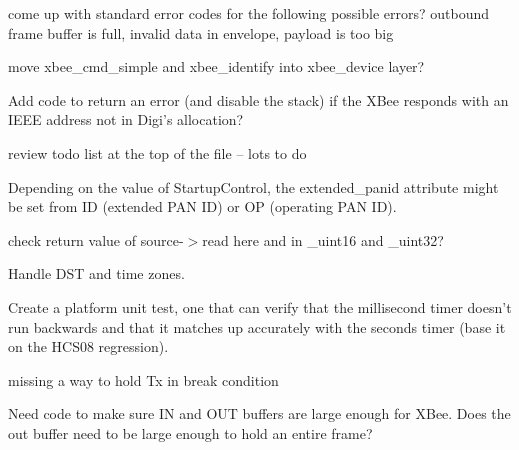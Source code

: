 \begin{DoxyRefList}
come up with standard error codes for the following possible errors? outbound frame buffer is full, invalid data in envelope, payload is too big  
\item[\label{todo__todo000006}%
\hypertarget{todo__todo000006}{}%
File \hyperlink{xbee__atcmd_8c}{xbee\-\_\-atcmd.c} ]move xbee\-\_\-cmd\-\_\-simple and xbee\-\_\-identify into xbee\-\_\-device layer?

Add code to return an error (and disable the stack) if the X\-Bee responds with an I\-E\-E\-E address not in Digi's allocation?

review todo list at the top of the file -- lots to do 
\item[\label{todo__todo000010}%
\hypertarget{todo__todo000010}{}%
Global \hyperlink{group__xbee__commissioning_ga886012f757de4a74d0c992d3ab04a373}{xbee\-\_\-comm\-\_\-\-S\-C} (\hyperlink{structzcl__comm__startup__param__t}{zcl\-\_\-comm\-\_\-startup\-\_\-param\-\_\-t} F\-A\-R $\ast$p, const void F\-A\-R $\ast$value\-\_\-be)]Depending on the value of Startup\-Control, the extended\-\_\-panid attribute might be set from I\-D (extended P\-A\-N I\-D) or O\-P (operating P\-A\-N I\-D). 
\item[\label{todo__todo000011}%
\hypertarget{todo__todo000011}{}%
Global \hyperlink{group__xbee__firmware_ga279def556401f533d798bb3896302ced}{xbee\-\_\-fw\-\_\-read\-\_\-byte} (\hyperlink{structxbee__fw__source__t}{xbee\-\_\-fw\-\_\-source\-\_\-t} $\ast$source)]check return value of source-\/$>$read here and in \-\_\-uint16 and \-\_\-uint32?  
\item[\label{todo__todo000012}%
\hypertarget{todo__todo000012}{}%
Global \hyperlink{group__xbee__time_gaed48be3b2d3a20dcd32ea14b52eb4e60}{xbee\-\_\-mktime} (struct tm $\ast$time\-\_\-rec)]Handle D\-S\-T and time zones.  
\item[\label{todo__todo000001}%
\hypertarget{todo__todo000001}{}%
File \hyperlink{xbee__platform__posix_8c}{xbee\-\_\-platform\-\_\-posix.c} ]Create a platform unit test, one that can verify that the millisecond timer doesn't run backwards and that it matches up accurately with the seconds timer (base it on the H\-C\-S08 regression).  
\item[\label{todo__todo000002}%
\hypertarget{todo__todo000002}{}%
File \hyperlink{xbee__serial__posix_8c}{xbee\-\_\-serial\-\_\-posix.c} ]missing a way to hold Tx in break condition  
\item[\label{todo__todo000003}%
\hypertarget{todo__todo000003}{}%
File \hyperlink{xbee__serial__rabbit_8c}{xbee\-\_\-serial\-\_\-rabbit.c} ]Need code to make sure I\-N and O\-U\-T buffers are large enough for X\-Bee. Does the out buffer need to be large enough to hold an entire frame? 

\end{DoxyRefList}
